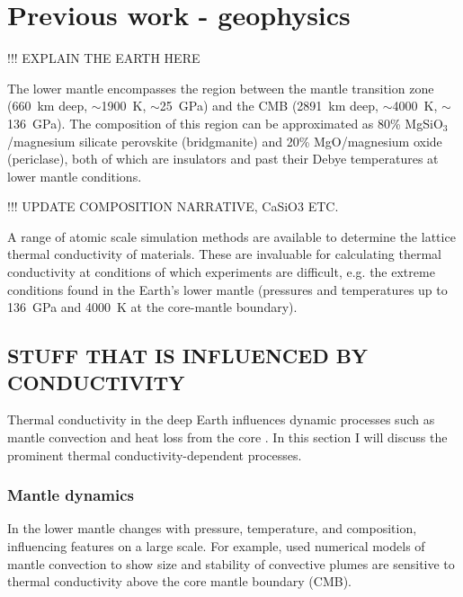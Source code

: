 \section{Previous work - geophysics}

!!! EXPLAIN THE EARTH HERE

The lower mantle encompasses the region between the mantle transition zone (660~km deep, $\sim$1900~K, $\sim$25~GPa) and the CMB (2891~km deep, $\sim$4000~K, $\sim$136~GPa). The composition of this region can be approximated as 80\% MgSiO$_3$/magnesium silicate perovskite (bridgmanite) and 20\% MgO/magnesium oxide (periclase), both of which are insulators and past their Debye temperatures at lower mantle conditions.

!!! UPDATE COMPOSITION NARRATIVE, CaSiO3 ETC.

A range of atomic scale simulation methods are available to determine the lattice thermal conductivity of materials. These are invaluable for calculating thermal conductivity at conditions of which experiments are difficult, e.g. the extreme conditions found in the Earth's lower mantle (pressures and temperatures up to 136~GPa and 4000~K at the core-mantle boundary). 

\subsection{STUFF THAT IS INFLUENCED BY CONDUCTIVITY}
\label{sec:ch1:cond_in_earth}

Thermal conductivity in the deep Earth influences dynamic processes such as mantle convection and heat loss from the core \citep{Lay2008}. In this section I will discuss the prominent thermal conductivity-dependent processes.

\subsubsection{Mantle dynamics}

In the lower mantle \tcs changes with pressure, temperature, and composition, influencing features on a large scale. For example, \citet{Naliboff2006} used numerical models of mantle convection to show size and stability of convective plumes are sensitive to thermal conductivity above the core mantle boundary (CMB).


